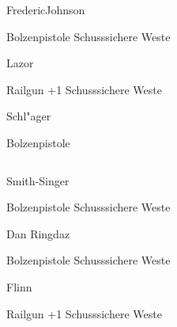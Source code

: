 \begin{column}[l]{0.45}
    \begin{nscsheet}[h]{Frederic\newline{}Johnson}
        \nscstats[ATT=2,COM=3]
        \nscruler
        \begin{nscinventory}
            \nscitem[Waffen] Bolzenpistole
            \nscitem[R"ustung] Schusssichere Weste
        \end{nscinventory}
    \end{nscsheet}

    \begin{nscsheet}[h]{Lazor}
        \nscstats[ATT=3,AGG=2]
        \nscruler
        \begin{nscinventory}
            \nscitem[Waffen] Railgun +1
            \nscitem[R"ustung] Schusssichere Weste
        \end{nscinventory}
    \end{nscsheet}


    \begin{nscsheet}[h]{Schl"ager}
        \nscstats[]
        \nscruler
        \begin{nscinventory}
            \nscitem[Waffen] Bolzenpistole
        \end{nscinventory}
    \end{nscsheet}    
\end{column}
\begin{column}[r]{0.45}
    \begin{nscsheet}[h]{Smith-Singer}
        \nscstats[ATT=2,AGG=2,DEX=2,COM=3]
        \nscruler
        \begin{nscinventory}
            \nscitem[Waffen] Bolzenpistole
            \nscitem[R"ustung] Schusssichere Weste
        \end{nscinventory}
    \end{nscsheet}

    \begin{nscsheet}[h]{Dan Ringdaz}
        \nscstats[ATT=2,AGG=2,COM=2]
        \nscruler
        \begin{nscinventory}
            \nscitem[Waffen] Bolzenpistole
            \nscitem[R"ustung] Schusssichere Weste
        \end{nscinventory}
    \end{nscsheet}

    \begin{nscsheet}[h]{Flinn}
        \nscstats[ATT=2,AGG=]
        \nscruler
        \begin{nscinventory}
            \nscitem[Waffen] Railgun +1
            \nscitem[R"ustung] Schusssichere Weste
        \end{nscinventory}
    \end{nscsheet}
\end{column}
\vfill
\pagebreak
